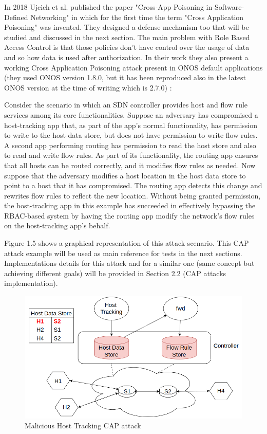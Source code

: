 In 2018 Ujcich et al. published the paper "Cross-App Poisoning in Software-Defined Networking" in which for the first time the term "Cross Application Poisoning" was invented. They designed a defense mechanism too that will be studied and discussed in the next section. The main problem with Role Based Access Control is that those policies don't have control over the usage of data and so how data is used after authorization. In their work they also present a working Cross Application Poisoning attack present in ONOS default applications (they used ONOS version 1.8.0, but it has been reproduced also in the latest ONOS version at the time of writing which is 2.7.0) \cite{cap-sdn}:
\begin{quoting}[font=itshape, begintext={"}, endtext={"}]
Consider the scenario in which an SDN controller provides host and flow rule services among its core functionalities. Suppose an adversary has compromised a host-tracking app that, as part of the app’s normal functionality, has permission to write to the host data store, but does not have permission to write flow rules. A second app performing routing has permission to read the host store and also to read and write flow rules. As part of its functionality, the routing app ensures that all hosts can be routed correctly, and it modifies flow rules as needed. Now suppose that the adversary modifies a host location in the host data store to point to a host that it has compromised. The routing app detects this change and rewrites flow rules to reflect the new location. Without being granted permission, the host-tracking app in this example has succeeded in effectively bypassing the RBAC-based system by having the routing app modify the network’s flow rules on the host-tracking app’s behalf.
\end{quoting}
Figure 1.5 shows a graphical representation of this attack scenario. This CAP attack example will be used as main reference for tests in the next sections. Implementations details for this attack and for a similar one (same concept but achieving different goals) will be provided in Section 2.2 (CAP attacks implementation).

\begin{figure}[t]
\caption{Malicious Host Tracking CAP attack}
\label{fig:cap2}
\includegraphics[width=1.0\textwidth]{resources/Chapter-1/cap2.png}
\centering
\end{figure}

